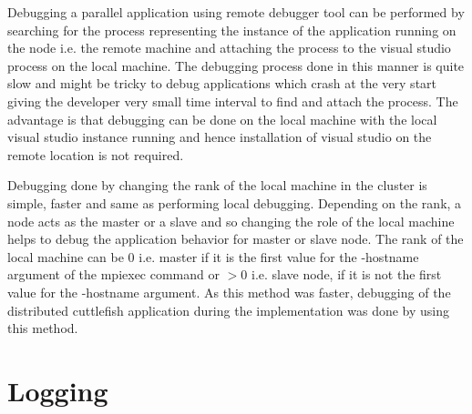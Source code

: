 Debugging a parallel application using remote debugger tool can be performed by searching for the process representing the instance of the application running on the node i.e. the remote machine and attaching the process to the visual studio process on the local machine. The debugging process done in this manner is quite slow and might be tricky to debug applications which crash at the very start giving the developer very small time interval to find and attach the process. The advantage is that debugging can be done on the local machine with the local visual studio instance running and hence installation of visual studio on the remote location is not required. \newline

Debugging done by changing the rank of the local machine in the cluster is simple, faster and same as performing local debugging. Depending on the rank, a node acts as the master or a slave and so changing the role of the local machine helps to debug the application behavior for master or slave node. The rank of the local machine can be 0 i.e. master if it is the first value for the -hostname argument of the mpiexec command or \begin{math}>0 \end{math} i.e. slave node, if it is not the first value for the -hostname argument. As this method was faster, debugging of the distributed cuttlefish application during the implementation was done by using this method. 

\section{Logging}

